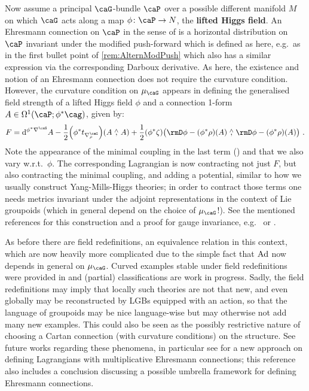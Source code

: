 \documentclass[reqno,a4paper,oneside]{amsart}
\newcommand\mutot{\mu_\caG}
\theoremstyle{plain}
\theoremstyle{remark}
\theoremstyle{definition}
\begin{document}
Now assume a principal $\caG$-bundle $\caP$ over a possible different manifold $M$ on which $\caG$ acts along a map $\phi \colon \caP \to N$, the \textbf{lifted Higgs field}. An Ehresmann connection on $\caP$ in the sense of \cite{Fischer:2024vak} is a horizontal distribution on $\caP$ invariant under the modified push-forward which is defined as here, e.g.\ as in the first bullet point of \ref{rem:AlternModPush} which also has a similar expression via the corresponding Darboux derivative. As here, the existence and notion of an Ehresmann connection does not require the curvature condition. However, the curvature condition on $\mutot$ appears in defining the generalised field strength of a lifted Higgs field $\phi$ and a connection 1-form $A \in \Omega^1(\caP; \phi^*\cag)$, given by:
\begin{equation*}
F
=
\mathrm{d}^{\phi^*\nabla^\caG} A
	- \frac{1}{2} \mleft(\phi^*t_{\nabla^\caG_\rho}\mright)\mleft( A \stackrel{\wedge}{,} A \mright)
	+ \frac12 \mleft(\phi^*\zeta\mright)\bigl( \rmD\phi - (\phi^*\rho)(A) \stackrel{\wedge}{,} \rmD\phi - (\phi^*\rho)(A) \bigr)~.
\end{equation*}
Note the appearance of the minimal coupling in the last term (\cite{CurvedYMH, MyThesis, Fischer:2024vak}) and that we also vary w.r.t.\ $\phi$. The corresponding Lagrangian is now contracting not just $F$, but also contracting the minimal coupling, and adding a potential, similar to how we usually construct Yang-Mills-Higgs theories; in order to contract those terms one needs metrics invariant under the adjoint representations in the context of Lie groupoids (which in general depend on the choice of $\mutot$!). See the mentioned references for this construction and a proof for gauge invariance, e.g.\ \cite{CurvedYMH} or \cite{MyThesis}.

As before there are field redefinitions, an equivalence relation in this context, \cite[Def.\ 4.5.1 and 4.7.10]{MyThesis} which are now heavily more complicated due to the simple fact that $\rm Ad$ now depends in general on $\mutot$. Curved examples stable under field redefinitions were provided in \cite{Fischer:2024vak} and (partial) classifications are work in progress. Sadly, the field redefinitions may imply that locally such theories are not that new, and even globally may be reconstructed by LGBs equipped with an action, so that the language of groupoids may be nice language-wise but may otherwise not add many new examples. This could also be seen as the possibly restrictive nature of choosing a Cartan connection (with curvature conditions) on the structure. See future works regarding these phenomena, in particular see \cite{grad2026yangmillstheorymultiplicativeehresmann} for a new approach on defining Lagrangians with multiplicative Ehresmann connections; this reference also includes a conclusion discussing a possible umbrella framework for defining Ehresmann connections.
\end{document}
